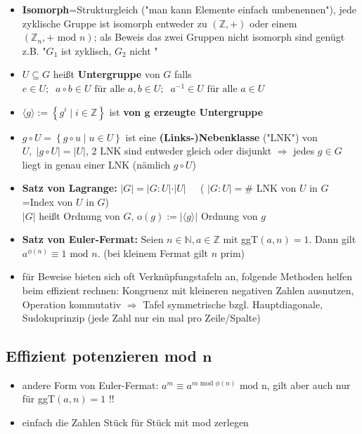 \documentclass[10pt,a4paper]{article}
\begin{document}
\begin{itemize}
\item \textbf{Isomorph}=Strukturgleich ("man kann Elemente einfach umbenennen"), jede zyklische Gruppe ist isomorph entweder zu $(\mathbb{Z},+)$ oder einem $(\mathbb{Z}_{n},+ \text{ mod } n)$; als Beweis das zwei Gruppen nicht isomorph sind genügt z.B. "$G_{1}$ ist zyklisch, $G_{2}$ nicht "
\item $U\subseteq G$ heißt \textbf{Untergruppe} von $G$ falls $e\in U;\;\; a\circ b \in U \text { für alle } a,b\in U;\;\; a^{-1} \in U \text{ für alle } a \in U$ 
\item $\langle g \rangle:=\left\lbrace g^{i}\mid i \in \mathbb{Z}\right\rbrace$ ist \textbf{von $\boldsymbol{g}$ erzeugte Untergruppe}
\item $g \circ U=\left\lbrace g\circ u \mid u \in U \right\rbrace$ ist eine \textbf{(Links-)Nebenklasse} ("LNK") von $U,\; \vert g\circ U\vert =\vert U\vert$, 2 LNK sind entweder gleich oder disjunkt $\Rightarrow$ jedes $g\in G$ liegt in genau einer LNK (nämlich $g\circ U$)
\item \textbf{Satz von Lagrange:} $\vert G \vert = \vert G : U \vert \cdot \vert U \vert\;\;\;\;$  ( $\vert G : U \vert=\#$ LNK von $U$ in $G$=Index von $U$ in $G$)\\ $\vert G \vert$ heißt Ordnung von $G$, o$(g):=\vert \langle g\rangle \vert$ Ordnung von $g$
\item \textbf{Satz von Euler-Fermat:} Seien $n\in \mathbb{N}, a\in \mathbb{Z}$ mit ggT$(a,n)=1$. Dann gilt $a^{\phi(n)}\equiv 1 \text{ mod } n$. (bei kleinem Fermat gilt $n$ prim)
\item für Beweise bieten sich oft Verknüpfungstafeln an, folgende Methoden helfen beim effizient rechnen: Kongruenz mit kleineren negativen Zahlen ausnutzen, Operation kommutativ $\Rightarrow$ Tafel symmetrische bzgl. Hauptdiagonale, Sudokuprinzip (jede Zahl nur ein mal pro Zeile/Spalte)
\end{itemize}



\subsection{Effizient potenzieren mod $\boldsymbol{n}$}
\begin{itemize}


\item andere Form von Euler-Fermat: $a^{m} \equiv a^{m \text { mod } \phi (n)} \text{ mod n}$, gilt aber auch nur für ggT$(a,n)=1$ !!
\item einfach die Zahlen Stück für Stück mit mod zerlegen
\end{itemize}
\end{document}
